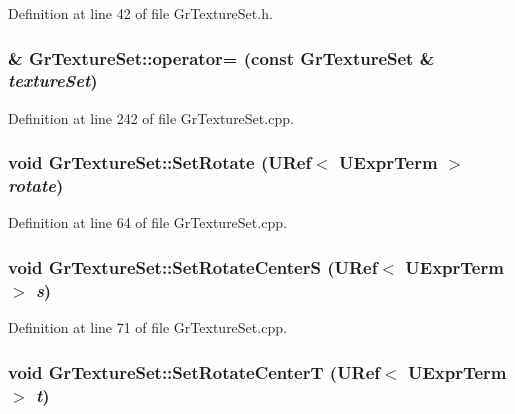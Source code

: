 Definition at line 42 of file GrTextureSet.h.\hypertarget{class_gr_texture_set_b74061702d1fc9d62f04e93638530df9}{
\subsubsection[{operator=}]{ \& GrTextureSet::operator= (const {\bf GrTextureSet} \& {\em textureSet})}}
\label{class_gr_texture_set_b74061702d1fc9d62f04e93638530df9}




Definition at line 242 of file GrTextureSet.cpp.\hypertarget{class_gr_texture_set_4a78fadd4dac3d729a17f3d5a82e8c0b}{
\subsubsection[{SetRotate}]{\setlength{\rightskip}{0pt plus 5cm}void GrTextureSet::SetRotate ({\bf URef}$<$ {\bf UExprTerm} $>$ {\em rotate})}}
\label{class_gr_texture_set_4a78fadd4dac3d729a17f3d5a82e8c0b}




Definition at line 64 of file GrTextureSet.cpp.\hypertarget{class_gr_texture_set_1eb411197132c395e312d922b21e95f3}{
\subsubsection[{SetRotateCenterS}]{\setlength{\rightskip}{0pt plus 5cm}void GrTextureSet::SetRotateCenterS ({\bf URef}$<$ {\bf UExprTerm} $>$ {\em s})}}
\label{class_gr_texture_set_1eb411197132c395e312d922b21e95f3}




Definition at line 71 of file GrTextureSet.cpp.\hypertarget{class_gr_texture_set_ae28e7233bbb26bd6b324d4b05ea6ed2}{
\subsubsection[{SetRotateCenterT}]{\setlength{\rightskip}{0pt plus 5cm}void GrTextureSet::SetRotateCenterT ({\bf URef}$<$ {\bf UExprTerm} $>$ {\em t})}}
\label{class_gr_texture_set_ae28e7233bbb26bd6b324d4b05ea6ed2}





